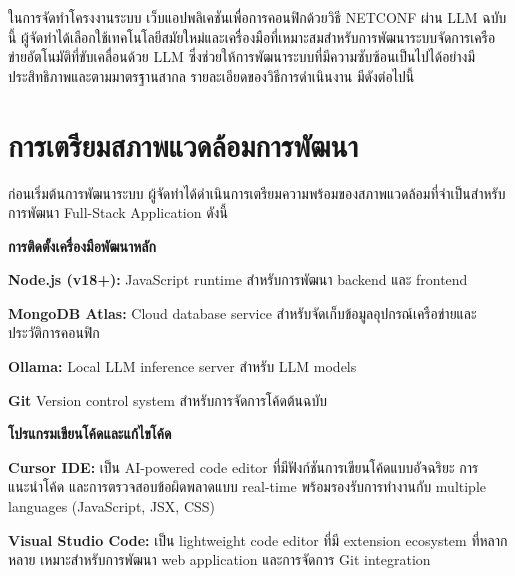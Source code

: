 ﻿%

\hspace*{1.3em} %
ในการจัดทำโครงงานระบบ เว็บแอปพลิเคชันเพื่อการคอนฟิกด้วยวิธี NETCONF ผ่าน LLM  ฉบับนี้ ผู้จัดทำได้เลือกใช้เทคโนโลยีสมัยใหม่และเครื่องมือที่เหมาะสมสำหรับการพัฒนาระบบจัดการเครือข่ายอัตโนมัติที่ขับเคลื่อนด้วย LLM ซึ่งช่วยให้การพัฒนาระบบที่มีความซับซ้อนเป็นไปได้อย่างมีประสิทธิภาพและตามมาตรฐานสากล รายละเอียดของวิธีการดำเนินงาน มีดังต่อไปนี้
\section{การเตรียมสภาพแวดล้อมการพัฒนา}

\hspace*{1.3em} %
ก่อนเริ่มต้นการพัฒนาระบบ ผู้จัดทำได้ดำเนินการเตรียมความพร้อมของสภาพแวดล้อมที่จำเป็นสำหรับการพัฒนา Full-Stack Application ดังนี้

\begin{mycustomenum2}
    \item \textbf{การติดตั้งเครื่องมือพัฒนาหลัก}
    \begin{mycustomenum2}
        \item \textbf{Node.js (v18+):} JavaScript runtime สำหรับการพัฒนา backend และ frontend
        \item \textbf{MongoDB Atlas:} Cloud database service สำหรับจัดเก็บข้อมูลอุปกรณ์เครือข่ายและประวัติการคอนฟิก
        \item \textbf{Ollama:} Local LLM inference server สำหรับ LLM models
        \item \textbf{Git} Version control system สำหรับการจัดการโค้ดต้นฉบับ
    \end{mycustomenum2}
    \item \textbf{โปรแกรมเขียนโค้ดและแก้ไขโค้ด}
    \begin{mycustomenum2}
        \item \textbf{Cursor IDE:} เป็น AI-powered code editor ที่มีฟังก์ชันการเขียนโค้ดแบบอัจฉริยะ การแนะนำโค้ด และการตรวจสอบข้อผิดพลาดแบบ real-time พร้อมรองรับการทำงานกับ multiple languages (JavaScript, JSX, CSS)
        \item \textbf{Visual Studio Code:} เป็น lightweight code editor ที่มี extension ecosystem ที่หลากหลาย เหมาะสำหรับการพัฒนา web application และการจัดการ Git integration
    \end{mycustomenum2}
\end{mycustomenum2}

